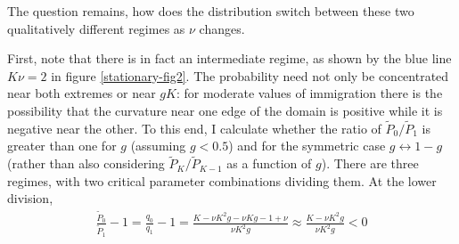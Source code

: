 The question remains, how does the distribution switch between these two qualitatively different regimes as $\nu$ changes. 
\iffalse
To observe this I calculate the curvature of the extremum point. 
It goes from positive to negative as the immigration rate is increased, and there must be a critical value at which it changes sign. 
This is found when $\partial_n^2 q_n=0$. 
I note that $\partial_n^2 q_n=\partial_n \big(q_n \partial_n \ln[q_n] \big) = q_n \big( (\partial_n \ln[q_n])^2 + \partial_n^2 \ln[q_n] \big)$. 
$q_n>0$ and $\partial_n \ln[q_n]=0$ at the extremum so an equivalent problem is to find the parameter values that make $\partial_n^2 \ln[q_n]=0$ at the extremum. 
\begin{align*}
 \partial_n^2 \ln[q_n] &= \frac{\gamma}{f-1} + \frac{\gamma}{f-\gamma+\epsilon g} + \frac{\gamma}{\gamma-f} + \frac{\gamma}{1-f+\epsilon(1-g)} + \frac{2\gamma^2}{f\big(1-f+\epsilon(1-g)\big)} + \frac{\gamma^2\big(2f-1-\epsilon(1-g)\big)}{f\big(1-f+\epsilon(1-g)\big)^2} + \frac{\gamma^2\big(1-2f+\epsilon(1-g)\big)}{f^2\big(1-f+\epsilon(1-g)\big)}
\end{align*}
Substituting $f^*$ and expanding to lowest order makes the sign proportional to
\begin{equation*}
 4 - 2\epsilon/\gamma - \big(1-4g(1-g)\big)\big(\epsilon/\gamma\big)^2
\end{equation*}
\fi
First, note that there is in fact an intermediate regime, as shown by the blue line $K\nu=2$ in figure \ref{stationary-fig2}. 
The probability need not only be concentrated near both extremes or near $gK$:
for moderate values of immigration there is the possibility that the curvature near one edge of the domain is positive while it is negative near the other. 
To this end, I calculate whether the ratio of $\widetilde{P}_0/\widetilde{P}_1$ is greater than one for $g$ (assuming $g<0.5$) and for the symmetric case $g\leftrightarrow 1-g$ (rather than also considering $\widetilde{P}_K/\widetilde{P}_{K-1}$ as a function of $g$). 
There are three regimes, with two critical parameter combinations dividing them. 
At the lower division,
\begin{align}
 \frac{\widetilde{P}_0}{\widetilde{P}_1} - 1 = \frac{q_0}{q_1} - 1 = \frac{K - \nu K^2 g - \nu K g - 1 + \nu}{\nu K^2 g} \approx \frac{K - \nu K^2 g}{\nu K^2 g} < 0
\end{align}
